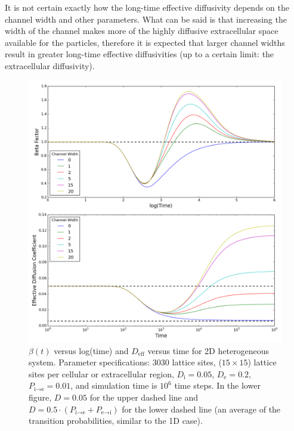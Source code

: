 	It is not certain exactly how the long-time effective diffusivity depends on the channel width and other parameters. What can be said is that increasing the width of the channel makes more of the highly diffusive extracellular space available for the particles, therefore it is expected that larger channel widths result in greater long-time effective diffusivities (up to a certain limit: the extracellular diffusivity).
	
	\begin{figure}[h]
		\centering
		\includegraphics[width=1.0\linewidth]{../images/2D/ye_beta_deff_2D}
		\caption[2D: $ \beta (t) $ and $ D_\textrm{eff} $ for varying extracellular channel widths]{$ \beta (t) $ versus log(time) and $ D_\textrm{eff} $ versus time for 2D heterogeneous system. Parameter specifications: 3030 lattice sites, ($ 15 \times 15 $) lattice sites per cellular or extracellular region, $ D_\textrm{i} = 0.05 $, $ D_\textrm{e} = 0.2 $, $ P_{\textrm{i} \rightarrow \textrm{e}} = 0.01 $, and simulation time is $ 10^6 $ time steps. In the lower figure, $ D = 0.05 $ for the upper dashed line and $ D = 0.5 \cdot (P_{\textrm{i} \rightarrow \textrm{e}} + P_{\textrm{e} \rightarrow \textrm{i}}) $ for the lower dashed line (an average of the transition probabilities, similar to the 1D case).}
		\label{fig:ye_beta_deff_2D}
	\end{figure}

	